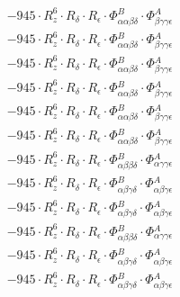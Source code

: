 \documentclass{article}
\begin{document}
\begin{subequations}
\begin{gather}
\begin{array}{c}
 \\[0.2em] 		 - 945 \cdot R_{z}^{6} \cdot R_{\delta{}} \cdot R_{\epsilon{}} \cdot \Phi{}^{B}_{\alpha{}\alpha{}\beta{}\delta{}} \cdot \Phi{}^{A}_{\beta{}\gamma{}\gamma{}\epsilon{}} 
 \\[0.2em] 		 - 945 \cdot R_{z}^{6} \cdot R_{\delta{}} \cdot R_{\epsilon{}} \cdot \Phi{}^{B}_{\alpha{}\alpha{}\beta{}\delta{}} \cdot \Phi{}^{A}_{\beta{}\gamma{}\gamma{}\epsilon{}} 
 \\[0.2em] 		 - 945 \cdot R_{z}^{6} \cdot R_{\delta{}} \cdot R_{\epsilon{}} \cdot \Phi{}^{B}_{\alpha{}\alpha{}\beta{}\delta{}} \cdot \Phi{}^{A}_{\beta{}\gamma{}\gamma{}\epsilon{}} 
 \\[0.2em] 		 - 945 \cdot R_{z}^{6} \cdot R_{\delta{}} \cdot R_{\epsilon{}} \cdot \Phi{}^{B}_{\alpha{}\alpha{}\beta{}\delta{}} \cdot \Phi{}^{A}_{\beta{}\gamma{}\gamma{}\epsilon{}} 
 \\[0.2em] 		 - 945 \cdot R_{z}^{6} \cdot R_{\delta{}} \cdot R_{\epsilon{}} \cdot \Phi{}^{B}_{\alpha{}\alpha{}\beta{}\delta{}} \cdot \Phi{}^{A}_{\beta{}\gamma{}\gamma{}\epsilon{}} 
 \\[0.2em] 		 - 945 \cdot R_{z}^{6} \cdot R_{\delta{}} \cdot R_{\epsilon{}} \cdot \Phi{}^{B}_{\alpha{}\alpha{}\beta{}\delta{}} \cdot \Phi{}^{A}_{\beta{}\gamma{}\gamma{}\epsilon{}} 
 \\[0.2em] 		 - 945 \cdot R_{z}^{6} \cdot R_{\delta{}} \cdot R_{\epsilon{}} \cdot \Phi{}^{B}_{\alpha{}\beta{}\beta{}\delta{}} \cdot \Phi{}^{A}_{\alpha{}\gamma{}\gamma{}\epsilon{}} 
 \\[0.2em] 		 - 945 \cdot R_{z}^{6} \cdot R_{\delta{}} \cdot R_{\epsilon{}} \cdot \Phi{}^{B}_{\alpha{}\beta{}\gamma{}\delta{}} \cdot \Phi{}^{A}_{\alpha{}\beta{}\gamma{}\epsilon{}} 
 \\[0.2em] 		 - 945 \cdot R_{z}^{6} \cdot R_{\delta{}} \cdot R_{\epsilon{}} \cdot \Phi{}^{B}_{\alpha{}\beta{}\gamma{}\delta{}} \cdot \Phi{}^{A}_{\alpha{}\beta{}\gamma{}\epsilon{}} 
 \\[0.2em] 		 - 945 \cdot R_{z}^{6} \cdot R_{\delta{}} \cdot R_{\epsilon{}} \cdot \Phi{}^{B}_{\alpha{}\beta{}\beta{}\delta{}} \cdot \Phi{}^{A}_{\alpha{}\gamma{}\gamma{}\epsilon{}} 
 \\[0.2em] 		 - 945 \cdot R_{z}^{6} \cdot R_{\delta{}} \cdot R_{\epsilon{}} \cdot \Phi{}^{B}_{\alpha{}\beta{}\gamma{}\delta{}} \cdot \Phi{}^{A}_{\alpha{}\beta{}\gamma{}\epsilon{}} 
 \\[0.2em] 		 - 945 \cdot R_{z}^{6} \cdot R_{\delta{}} \cdot R_{\epsilon{}} \cdot \Phi{}^{B}_{\alpha{}\beta{}\gamma{}\delta{}} \cdot \Phi{}^{A}_{\alpha{}\beta{}\gamma{}\epsilon{}} 

\end{array}
\end{gather}
\end{subequations}
\end{document}
